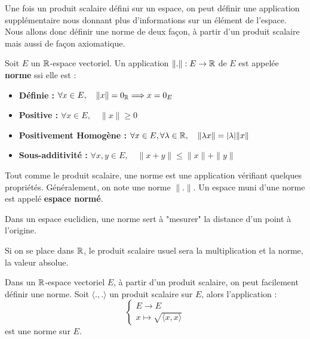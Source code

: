 Une fois un produit scalaire défini sur un espace, on peut définir une application supplémentaire nous donnant plus d'informations 
sur un élément de l'espace. Nous allons donc définir une norme de deux façon, à partir d'un produit scalaire mais aussi 
de façon axiomatique. 

\begin{definition}[Norme]
    Soit $E$ un $\mathbb{R}$-espace vectoriel. Un application $\|.\| : E \rightarrow \mathbb{R}$ de $E$ est appelée \textbf{norme} ssi elle est : 
    \begin{itemize}
        \item \textbf{Définie : } $ \forall x \in E, \quad \|x \| = 0_{\mathbb{R}} \Longrightarrow x = 0_E $
        \item \textbf{Positive : } $ \forall x \in E, \quad \| x \| \geqslant 0 $
        \item \textbf{Positivement Homogène : } $ \forall x \in E, \forall \lambda \in \mathbb{R}, \quad \| \lambda x \| = |\lambda | \| x\| $  
        \item \textbf{Sous-additivité : } $ \forall x,y \in E, \quad \| x + y \| \leqslant \| x \| + \|y\| $
    \end{itemize}    
\end{definition}

\begin{remark}
    Tout comme le produit scalaire, une norme est une application vérifiant quelques propriétés. 
    Généralement, on note une norme $\|.\|$. Un espace muni d'une norme est appelé \textbf{espace normé}. 

    Dans un espace euclidien, une norme sert à "mesurer" la distance d'un point à l'origine. 
\end{remark}

\begin{example}
    Si on se place dans $\mathbb{R}$, le produit scalaire usuel sera la multiplication et la norme, la valeur absolue. 
\end{example}

\begin{proposition}
    Dans un $\mathbb{R}$-espace vectoriel $E$, à partir d'un produit scalaire, on peut facilement définir une norme. 
    Soit $\langle .,. \rangle$ un produit scalaire sur $E$, alors l'application :
        \[
            \begin{cases}
                E \longrightarrow E \\
                x \longmapsto \sqrt{\langle x,x \rangle}
            \end{cases}
        \] 
    est une norme sur $E$. 
\end{proposition}


